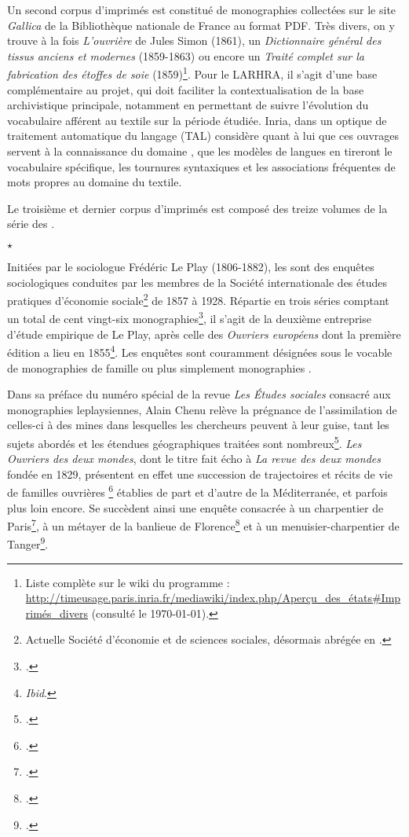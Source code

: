 Un second corpus d'imprimés est constitué de monographies collectées sur le site \textit{Gallica} de la Bibliothèque nationale de France au format PDF. Très divers, on y trouve à la fois \textit{L'ouvrière} de Jules Simon (1861), un \textit{Dictionnaire général des tissus anciens et modernes} (1859-1863) ou encore un \textit{Traité complet sur la fabrication des étoffes de soie} (1859)\footnote{Liste complète sur le wiki du programme : \url{http://timeusage.paris.inria.fr/mediawiki/index.php/Aperçu_des_états\#Imprimés_divers} (consulté le \today).}. Pour le LARHRA, il s'agit d'une base complémentaire au projet, qui doit faciliter la contextualisation de la base archivistique principale, notamment en permettant de suivre l'évolution du  vocabulaire afférent au textile sur la période étudiée. Inria, dans un optique de traitement automatique du langage (TAL) considère quant à lui que ces ouvrages servent à la \og connaissance du domaine \fg{}, \cad{} que les modèles de langues en tireront le vocabulaire spécifique, les tournures syntaxiques et les associations fréquentes de mots propres au domaine du textile.

Le troisième et dernier corpus d'imprimés est composé des treize volumes de la série des \odm.

\begin{center}
$\star$
\end{center} 

Initiées par le sociologue Frédéric Le Play (1806-1882), les \odm{} sont des enquêtes sociologiques conduites par les membres de la Société internationale des études pratiques d’économie sociale\footnote{Actuelle Société d'économie et de sciences sociales, désormais abrégée en \sess.} de 1857 à 1928. Répartie en trois séries comptant un total de cent vingt-six monographies\footnote{\cite[p. 95]{lorry}.}, il s'agit de la deuxième entreprise d'étude empirique de Le Play, après celle des \textit{Ouvriers européens} dont la première édition a lieu en 1855\footnote{\textit{Ibid}.}. Les enquêtes sont couramment désignées sous le vocable de \og monographies de famille \fg{} ou plus simplement \og monographies \fg{}.

Dans sa préface du numéro spécial de la revue \textit{Les Études sociales} consacré aux monographies leplaysiennes, Alain Chenu relève la prégnance de l'assimilation de celles-ci à des \og mines \fg{} dans lesquelles les chercheurs peuvent \og [puiser] \fg{} à leur guise, tant les sujets abordés et les étendues géographiques traitées sont nombreux\footnote{\cite[p. 5]{chenu}.}. \textit{Les Ouvriers des deux mondes}, dont le titre fait écho à \textit{La revue des deux mondes} fondée en 1829, présentent en effet une succession de \og trajectoires et récits de vie de familles ouvrières \fg{}\footnote{\cite[p. 193]{baciocchi}.} établies de part et d'autre de la Méditerranée, et parfois plus loin encore. Se succèdent ainsi une enquête consacrée à un charpentier de Paris\footcite{mono001a}, à un métayer de la banlieue de Florence\footcite{mono005a} et à un menuisier-charpentier de Tanger\footcite{mono012a}.

